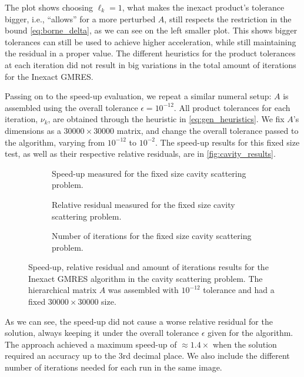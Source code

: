 The plot shows choosing $\ell_{k} = 1$, what makes the inexact product's tolerance bigger, i.e., “allows” for a more perturbed $A$, still respects the restriction in the bound \ref{eq:borne_delta}, as we can see on the left smaller plot. This shows bigger tolerances can still be used to achieve higher acceleration, while still maintaining the residual in a proper value. The different heuristics for the product tolerances at each iteration did not result in big variations in the total amount of iterations for the Inexact GMRES.

Passing on to the speed-up evaluation, we repeat a similar numeral setup: $A$ is assembled using the overall tolerance $\epsilon = 10^{-12}$. All product tolerances for each iteration, $\nu_{k}$, are obtained through the heuristic in \ref{eq:gen_heuristics}. We fix $A$'s dimensions as a $30000\times 30000$ matrix, and change the overall tolerance passed to the algorithm, varying from $10^{-12}$ to $10^{-2}$. The speed-up results for this fixed size test, as well as their respective relative residuals, are in \autoref{fig:cavity_results}.

\begin{figure}[h!]
    \centering
    \begin{subfigure}[b]{0.6\linewidth}
        
        \caption{Speed-up measured for the fixed size cavity scattering problem.}
    \end{subfigure}
    \begin{subfigure}[b]{0.4\linewidth}
        
        \caption{Relative residual measured for the fixed size cavity scattering problem.}
    \end{subfigure}
    \begin{subfigure}[b]{0.4\linewidth}
        
        \caption{Number of iterations for the fixed size cavity scattering problem.}
    \end{subfigure}
    \caption{Speed-up, relative residual and amount of iterations results for the Inexact GMRES algorithm in the cavity scattering problem. The hierarchical matrix $A$ was assembled with $10^{-12}$ tolerance and had a fixed $30000 \times 30000$ size.}
    \label{fig:cavity_results}
\end{figure}

As we can see, the speed-up did not cause a worse relative residual for the solution, always keeping it under the overall tolerance $\epsilon$ given for the algorithm. The approach achieved a maximum speed-up of $\approx 1.4\times$ when the solution required an accuracy up to the 3rd decimal place. We also include the different number of iterations needed for each run in the same image.

